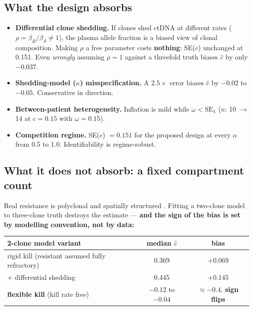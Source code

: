 \documentclass[11pt,a4paper]{article}
\newcommand{\chat}{\hat{c}}
\begin{document}
\subsection{What the design absorbs}

\begin{itemize}[leftmargin=1.4em,itemsep=0.3em]
\item \textbf{Differential clone shedding.} If clones shed ctDNA at different rates
($\rho = \beta_R/\beta_S \neq 1$), the plasma allele fraction is a biased view of
clonal composition. Making $\rho$ a free parameter costs \textbf{nothing}: SE($c$)
unchanged at 0.151. Even \emph{wrongly} assuming $\rho = 1$ against a threefold
truth biases $\chat$ by only $-0.037$.
\item \textbf{Shedding-model ($\kappa$) misspecification.} A $2.5\times$ error
biases $\chat$ by $-0.02$ to $-0.05$. Conservative in direction.
\item \textbf{Between-patient heterogeneity.} Inflation is mild while
$\omega < \mathrm{SE}_1$ ($n$: 10 $\to$ 14 at $c = 0.15$ with $\omega = 0.15$).
\item \textbf{Competition regime.} SE($c$) $=0.151$ for the proposed design at every
$\alpha$ from 0.5 to 1.0. Identifiability is regime-robust.
\end{itemize}

\subsection{What it does not absorb: a fixed compartment count}

Real resistance is polyclonal and spatially structured
\citep{gerlinger2012intratumor,diaz2012molecular,misale2012emergence}. Fitting a
two-clone model to three-clone truth destroys the estimate --- \textbf{and the sign
of the bias is set by modelling convention, not by data:}

\begin{center}
\begin{tabular}{lcc}
\toprule
\textbf{2-clone model variant} & \textbf{median $\chat$} & \textbf{bias}\\
\midrule
rigid kill (resistant assumed fully refractory) & 0.369 & $\mathbf{+0.069}$\\
$+$ differential shedding & 0.445 & $\mathbf{+0.145}$\\
\textbf{flexible kill} (kill rate free) & $\mathbf{-0.12}$ to $\mathbf{-0.04}$ & $\mathbf{\approx -0.4}$, \textbf{sign flips}\\
\bottomrule
\end{tabular}
\end{center}
\end{document}
